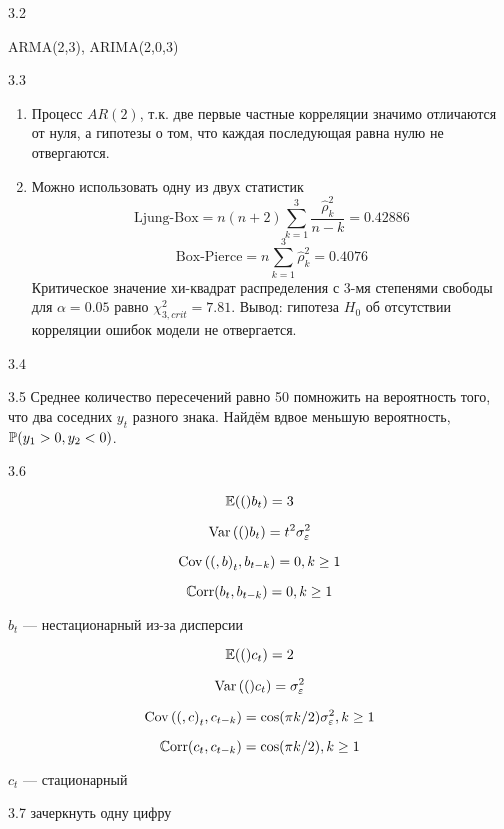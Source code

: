 \protect \hypertarget {soln:3.2}{}
\begin{solution}{{3.2}}

ARMA(2,3), ARIMA(2,0,3)
\end{solution}
\protect \hypertarget {soln:3.3}{}
\begin{solution}{{3.3}}
\begin{enumerate}
\item Процесс $AR(2)$, т.к. две первые частные корреляции значимо отличаются от нуля, а гипотезы о том, что каждая последующая равна нулю не отвергаются.
\item Можно использовать одну из двух статистик
\[
\text{Ljung-Box}=n(n+2)\sum_{k=1}^3\frac{\hat{\rho}_k^2}{n-k}=
0.42886
\]
\[
\text{Box-Pierce}=n\sum_{k=1}^3\hat{\rho}_k^2=
0.4076
\]
Критическое значение хи-квадрат распределения с 3-мя степенями свободы для $\alpha=0.05$ равно $\chi^2_{3,crit}=7.81$.
Вывод: гипотеза $H_0$ об отсутствии корреляции ошибок модели не отвергается.
\end{enumerate}
\end{solution}
\protect \hypertarget {soln:3.4}{}
\begin{solution}{{3.4}}

\end{solution}
\protect \hypertarget {soln:3.5}{}
\begin{solution}{{3.5}}
Среднее количество пересечений равно 50 помножить на вероятность того, что два соседних $y_t$ разного знака. Найдём вдвое меньшую вероятность, $\P(y_1>0, y_2 <0)$.
\end{solution}
\protect \hypertarget {soln:3.6}{}
\begin{solution}{{3.6}}

\[
\E(b_t) = 3
\]

\[
\Var(b_t) = t^2 \sigma^2_{\e}
\]

\[
\Cov(b_t, b_{t-k}) = 0, k \geq 1
\]

\[
\Corr(b_t, b_{t-k}) = 0, k \geq 1
\]

$b_t$ — нестационарный из-за дисперсии


\[
\E(c_t) = 2
\]

\[
\Var(c_t) = \sigma^2_{\e}
\]

\[
\Cov(c_t, c_{t-k}) = \cos( \pi k /2)\sigma^2_{\e}, k \geq 1
\]

\[
\Corr(c_t, c_{t-k}) = \cos( \pi k /2), k \geq 1
\]

$c_t$ — стационарный
\end{solution}
\protect \hypertarget {soln:3.7}{}
\begin{solution}{{3.7}}
зачеркнуть одну цифру
\end{solution}
